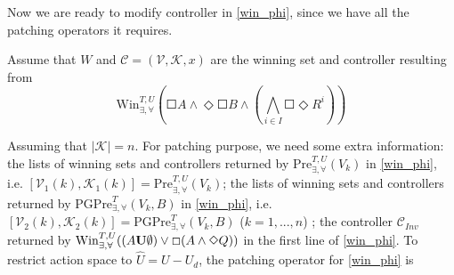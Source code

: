 Now we are ready to modify controller in \eqref{win_phi}, since we have all the patching operators it requires. 

Assume that $ W $ and $ \mathcal{C}=(\mathcal{V},\mathcal{K},x) $ are the winning set and controller resulting from 
\begin{displaymath}
\text{Win}_{\exists, \forall}^{T,U}\left(\Square A \wedge \Diamond \Square B \wedge \left( \bigwedge_{i\in I} \Square \Diamond R^i\right)\right)
\end{displaymath}

Assuming that $ \vert \mathcal{K}\vert = n $. For patching purpose, we need some extra information: the lists of winning sets and controllers returned by $\text{Pre}_{\exists,\forall}^{T,U}(V_k)$ in \eqref{win_phi}, i.e. $ [\mathcal{V}_1(k),\mathcal{K}_1(k)]=\text{Pre}_{\exists,\forall}^{T,U}(V_k)$;  the lists of winning sets and controllers returned by $ \text{PGPre}_{\exists,\forall}^{T}(V_k, B) $ in \eqref{win_phi}, i.e. $ [\mathcal{V}_2(k), \mathcal{K}_2(k)]= \text{PGPre}_{\exists,\forall}^{T}(V_k, B)$ ($ k=1,..., n $) ; the controller $ \mathcal{C}_{Inv} $ returned by $ \text{\text{Win}}^{T,U}_{\exists, \forall} ((A\mathbf{U}\emptyset)\vee \Square (A\wedge \Diamond Q)) $ in the first line of \eqref{win_phi}. To restrict action space to $ \widehat{U} = U-U_d $, the patching operator for \eqref{win_phi} is 
